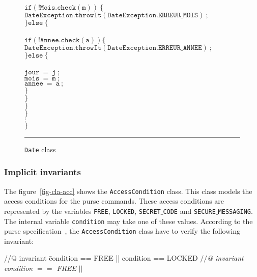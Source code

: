 \documentclass[a4paper]{llncs}
\begin{document}
\begin{center}
\begin{figure}[hbt]
\begin{tabbing}
\>\> \\
\>\>\>$\mathtt{if(!Mois.check(m))\ \{}$\\
\>\>\>\>$\mathtt{DateException.throwIt(DateException.ERREUR\_MOIS)\ ;}$ \\
\>\>\>$\mathtt{\}else\ \{}$ \\
\>\>\> \\
\>\>\>\>$\mathtt{if(!Annee.check(a)) \{}$ \\
\>\>\>\>\>$\mathtt{DateException.throwIt(DateException.ERREUR\_ANNEE)\ ;}$ \\
\>\>\>\>$\mathtt{\}else\ \{}$ \\
\>\>\>\> \\
\>\>\>\>\>$\mathtt{jour\ =\ j\ ;} $\\
\>\>\>\>\>$\mathtt{mois\ =\ m\ ;} $\\
\>\>\>\>\>$\mathtt{annee\ =\ a\ ;} $\\
\>\>\>\>$\mathtt{\}}$ \\
\>\>\>$\mathtt{\}} $\\
\>\>$\mathtt{\}} $\\
\>$\mathtt{\}} $\\
\>$\vdots$ \\
$\mathtt{\}}$ \\
\end{tabbing}
\caption{{\tt Date} class}
\label{fig-cla-dat}
\rule{\linewidth}{0.3mm}
\end{figure}
\end{center}






\subsubsection{Implicit invariants}
The figure~\ref{fig-cla-acc} shows the \texttt{AccessCondition}
class. This class models the access conditions for the purse
commands. These access conditions are represented by the variables
\texttt{FREE}, \texttt{LOCKED}, \texttt{SECRET$\_$CODE} and
\texttt{SECURE$\_$MESSAGING}. The internal variable \texttt{condition} 
may take one of these values. According to the purse
specification~\cite{BMGL00}, the \texttt{AccessCondition} class have
to verify the following invariant$:$ \\

\begin{tabbing}
//@ invariant \=condition == FREE || condition == LOCKED \kill
{\it $\slash\slash$@ invariant condition $==$ FREE $||$} \\
 \\
 \\
 \\
 \\
\end{tabbing}
\end{document}
